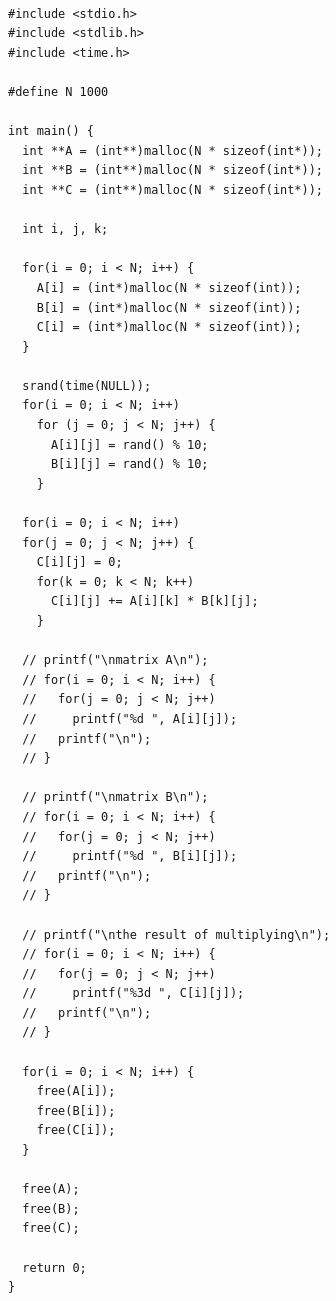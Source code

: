 \documentclass[12pt,a4paper]{scrartcl}
\begin{document}
\begin{lstlisting}[label=code,caption=Произведение матриц]                % Начало блока кода

#include <stdio.h>
#include <stdlib.h>
#include <time.h>

#define N 1000

int main() {
  int **A = (int**)malloc(N * sizeof(int*));
  int **B = (int**)malloc(N * sizeof(int*));
  int **C = (int**)malloc(N * sizeof(int*));

  int i, j, k;

  for(i = 0; i < N; i++) {
    A[i] = (int*)malloc(N * sizeof(int));
    B[i] = (int*)malloc(N * sizeof(int));
    C[i] = (int*)malloc(N * sizeof(int));
  }

  srand(time(NULL));
  for(i = 0; i < N; i++)
    for (j = 0; j < N; j++) {
      A[i][j] = rand() % 10;
      B[i][j] = rand() % 10;
    }

  for(i = 0; i < N; i++)
  for(j = 0; j < N; j++) {
    C[i][j] = 0;
    for(k = 0; k < N; k++)
      C[i][j] += A[i][k] * B[k][j];
    }

  // printf("\nmatrix A\n");
  // for(i = 0; i < N; i++) {
  //   for(j = 0; j < N; j++)
  //     printf("%d ", A[i][j]);
  //   printf("\n");
  // }

  // printf("\nmatrix B\n");
  // for(i = 0; i < N; i++) {
  //   for(j = 0; j < N; j++)
  //     printf("%d ", B[i][j]);
  //   printf("\n");
  // }

  // printf("\nthe result of multiplying\n");
  // for(i = 0; i < N; i++) {
  //   for(j = 0; j < N; j++)
  //     printf("%3d ", C[i][j]);
  //   printf("\n");
  // }

  for(i = 0; i < N; i++) {
    free(A[i]);
    free(B[i]);
    free(C[i]);
  }

  free(A);
  free(B);
  free(C);

  return 0;
}

\end{lstlisting}
\end{document}
